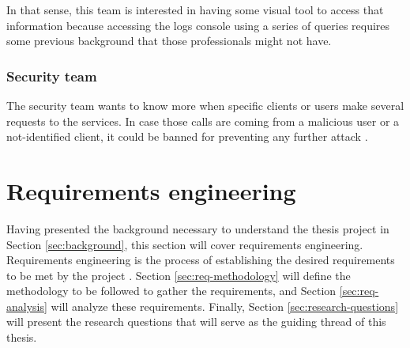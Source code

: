 \documentclass[english, 12pt, a4paper, sci, utf8, a-1b, online]{aaltothesis}
\begin{document}
In that sense, this team is interested in having some visual tool to access that information because accessing the logs console using a series of queries requires some previous background that those professionals might not have.

\subsubsection*{Security team}

The security team wants to know more when specific clients or users make several requests to the services. In case those calls are coming from a malicious user or a not-identified client, it could be banned for preventing any further attack \cite{jhaveri2012attacks}.

\clearpage
\section{Requirements engineering}
\label{sec:requirements-eng}





Having presented the background necessary to understand the thesis project in Section \ref{sec:background}, this section will cover requirements engineering.\\

Requirements engineering is the process of establishing the desired requirements to be met by the project \cite{hay2003requirements}. Section \ref{sec:req-methodology} will define the methodology to be followed to gather the requirements, and Section \ref{sec:req-analysis} will analyze these requirements. Finally, Section \ref{sec:research-questions} will present the research questions that will serve as the guiding thread of this thesis.
\end{document}
